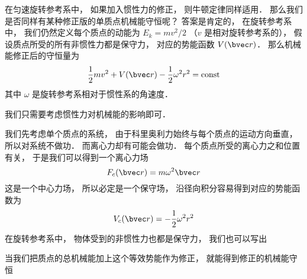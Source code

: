 

在匀速旋转参考系中， 如果加入惯性力的修正， 则牛顿定律同样适用． 那么我们是否同样有某种修正版的单质点机械能守恒呢？ 答案是肯定的， 在旋转参考系中， 我们仍然定义每个质点的动能为 $E_k = mv^2/2$ （$v$ 是相对旋转参考系的）， 假设质点所受的所有非惯性力都是保守力， 对应的势能函数 $V(\bvec r)$． 那么机械能修正后的守恒量为
\begin{equation}
\frac{1}{2}m v^2 + V(\bvec r) - \frac{1}{2}\omega^2 r^2 = \text{const}
\end{equation}
其中 $\omega$ 是旋转参考系相对于惯性系的角速度．

我们只需要考虑惯性力对机械能的影响即可．

我们先考虑单个质点的系统， 由于科里奥利力始终与每个质点的运动方向垂直， 所以对系统不做功． 而离心力却有可能会做功． 每个质点所受的离心力之和位置有关， 于是我们可以得到一个离心力场
\begin{equation}
F_c(\bvec r) = m\omega^2 \bvec r
\end{equation}
 这是一个中心力场， 所以必定是一个保守场， 沿径向积分容易得到对应的势能函数为
\begin{equation}
V_c(\bvec r) = -\frac{1}{2}\omega^2 r^2
\end{equation}
在旋转参考系中， 物体受到的非惯性力也都是保守力， 我们也可以写出

当我们把质点的总机械能加上这个等效势能作为修正， 就能得到修正的机械能守恒
